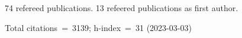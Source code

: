 74 refereed publications. 13 refeered publications as first author.

Total citations~=~3139; h-index~=~31 (2023-03-03)